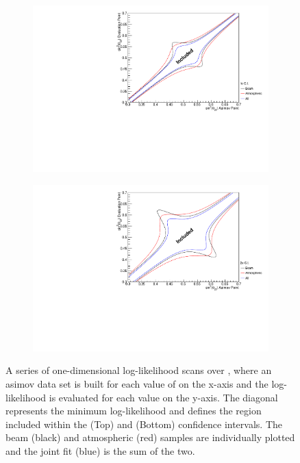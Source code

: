 \begin{figure}[h]
  \begin{subfigure}[t]{1.0\textwidth}
    \includegraphics[width=\textwidth, trim={0mm 0mm 0mm 0mm}, clip,page=1]{Figures/OA/TH23_Scans_1Sig.pdf}
  \end{subfigure}                                                                                                                                                                                          
  \begin{subfigure}[t]{1.0\textwidth}
    \includegraphics[width=\textwidth, trim={0mm 0mm 0mm 0mm}, clip,page=1]{Figures/OA/TH23_Scans_2Sig.pdf}
  \end{subfigure}
  \caption{A series of one-dimensional log-likelihood scans over \sinsqatm, where an asimov data set is built for each value of \sinsqatm on the x-axis and the log-likelihood is evaluated for each value on the y-axis. The diagonal represents the minimum log-likelihood and defines the region included within the \quickmath{1\sigma} (Top) and \quickmath{2\sigma} (Bottom) confidence intervals. The beam (black) and atmospheric (red) samples are individually plotted and the joint fit (blue) is the sum of the two.}
  \label{fig:OscillationAnalysis_AsimovEval_TH23}
\end{figure}

